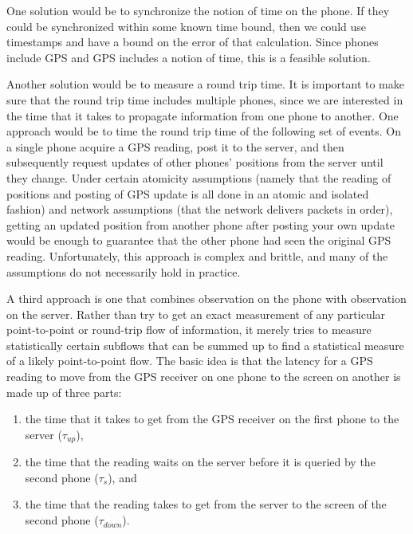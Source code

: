 \documentclass{acm_proc_article-sp}
\begin{document}
One solution would be to synchronize the notion of time on the phone.
If they could be synchronized within some known time bound, then we
could use timestamps and have a bound on the error of that
calculation.  Since phones include GPS and GPS includes a notion of
time, this is a feasible solution.

Another solution would be to measure a round trip time.  It is
important to make sure that the round trip time includes multiple
phones, since we are interested in the time that it takes to propagate
information from one phone to another.  One approach would be to time
the round trip time of the following set of events.  On a single phone
acquire a GPS reading, post it to the server, and then subsequently
request updates of other phones' positions from the server until they
change.  Under certain atomicity assumptions (namely that the reading
of positions and posting of GPS update is all done in an atomic and
isolated fashion) and network assumptions (that the network delivers
packets in order), getting an updated position from another phone
after posting your own update would be enough to guarantee that the
other phone had seen the original GPS reading.  Unfortunately, this
approach is complex and brittle, and many of the assumptions do not
necessarily hold in practice.

A third approach is one that combines observation on the phone with
observation on the server.  Rather than try to get an exact
measurement of any particular point-to-point or round-trip flow of
information, it merely tries to measure statistically certain subflows
that can be summed up to find a statistical measure of a likely
point-to-point flow.  The basic idea is that the latency for a GPS
reading to move from the GPS receiver on one phone to the screen on
another is made up of three parts:

\begin{enumerate}
\item the time that it takes to get from the GPS receiver on the first phone to the server ($\tau_{up}$),
\item the time that the reading waits on the server before it is queried by the second phone ($\tau_{s}$), and
\item the time that the reading takes to get from the server to the screen of the second phone ($\tau_{down}$).
\end{enumerate}
\end{document}
